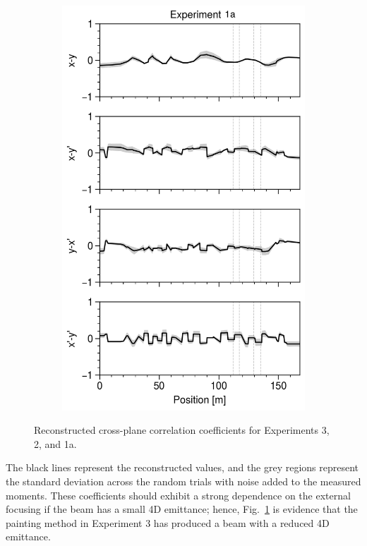 \begin{figure}[!p]
\begin{subfigure}{0.32\textwidth}
        \includegraphics[width=\textwidth]{Images/chapter5/exp1a/compare_corr.png}
    \end{subfigure}
    \caption{Reconstructed cross-plane correlation coefficients for Experiments 3, 2, and 1a.}
    \label{fig:exp3_compare_corr}
    \vspace*{3.0cm}
\end{figure}
% 
The black lines represent the reconstructed values, and the grey regions represent the standard deviation across the random trials with noise added to the measured moments. These coefficients should exhibit a strong dependence on the external focusing if the beam has a small 4D emittance; hence, Fig.~\ref{fig:exp3_compare_corr} is evidence that the painting method in Experiment 3 has produced a beam with a reduced 4D emittance.

